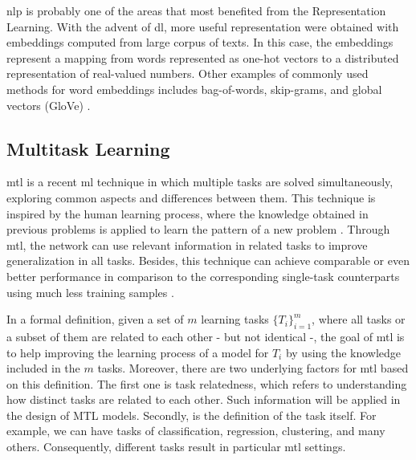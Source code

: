\acf{nlp} is probably one of the areas that most benefited from the Representation Learning. With the advent of \acl{dl}, more useful representation were obtained with embeddings computed from large corpus of texts. In this case, the embeddings represent a mapping from words represented as one-hot vectors to a distributed representation of real-valued numbers. Other examples of commonly used methods for word embeddings includes bag-of-words, skip-grams, and global vectors (GloVe) \citep{pennington2014glove, mikolov2013efficient}.

\subsection{Multitask Learning}

\acf{mtl} is a recent \acl{ml} technique in which multiple tasks are solved simultaneously, exploring common aspects and differences between them. This technique is inspired by the human learning process, where the knowledge obtained in previous problems is applied to learn the pattern of a new problem \citep{zhang2017survey}. Through \acs{mtl}, the network can use relevant information in related tasks to improve generalization in all tasks. Besides, this technique can achieve comparable or even better performance in comparison to the corresponding single-task counterparts using much less training samples \citep{domhan2017using, singla2018multi}.

In a formal definition, given a set of $m$ learning tasks $\{T_i\}_{i=1}^m$, where all tasks or a subset of them are related to each other - but not identical -, the goal of \acs{mtl} is to help improving the learning process of a model for $T_i$ by using the knowledge included in the $m$ tasks. Moreover, there are two underlying factors for \acs{mtl} based on this definition. The first one is task relatedness, which refers to understanding how distinct tasks are related to each other. Such information will be applied in the design of MTL models. Secondly, is the definition of the task itself. For example, we can have tasks of classification, regression, clustering, and many others. Consequently, different tasks result in particular \acs{mtl} settings.

